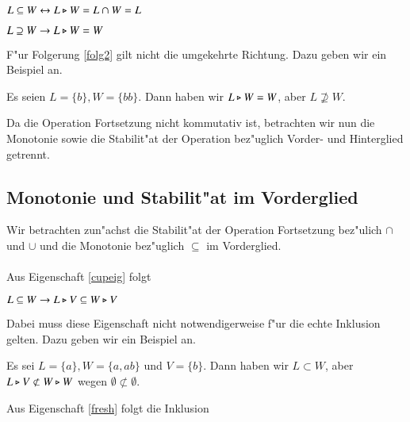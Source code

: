\vspace{2ex}

\begin{folg}\label{folg1}
$L\subseteq W \leftrightarrow L\triangleright W = L\cap W = L$
\end{folg}

\vspace{2ex}

\begin{folg}\label{folg2}
$L\supseteq W \to L\triangleright W = W$
\end{folg}
F"ur Folgerung \ref{folg2} gilt nicht die umgekehrte Richtung. Dazu geben wir ein Beispiel an.

\vspace{2ex}

\begin{beispiel}
Es seien $L=\{b\}, W=\{bb\}$. Dann haben wir $L\triangleright W = W$, aber $L\not\supseteq W$.
\end{beispiel}

Da die Operation Fortsetzung nicht kommutativ ist, betrachten wir nun die Monotonie sowie die Stabilit"at der Operation bez"uglich Vorder- und Hinterglied getrennt.
\subsection{Monotonie und Stabilit"at im Vorderglied}

Wir betrachten zun"achst die Stabilit"at der Operation Fortsetzung bez"ulich $\cap$ und $\cup$ und die Monotonie bez"uglich $\subseteq$ im Vorderglied.\\\\
Aus Eigenschaft \ref{cupeig} folgt

\vspace{2ex}

\begin{eigen}\label{fresh}
$L\subseteq W \to L\triangleright V \subseteq W \triangleright V$
\end{eigen}
Dabei muss diese Eigenschaft nicht notwendigerweise f"ur die echte Inklusion gelten. Dazu geben wir ein Beispiel an.

\vspace{2ex}

\begin{beispiel}
Es sei $L=\{a\}, W=\{a,ab\}$ und $V=\{b\}$. Dann haben wir $L\subset W$, aber $L\triangleright V \not\subset W\triangleright W$ wegen $\emptyset \not\subset\emptyset$.
\end{beispiel}

Aus Eigenschaft \ref{fresh} folgt die Inklusion

